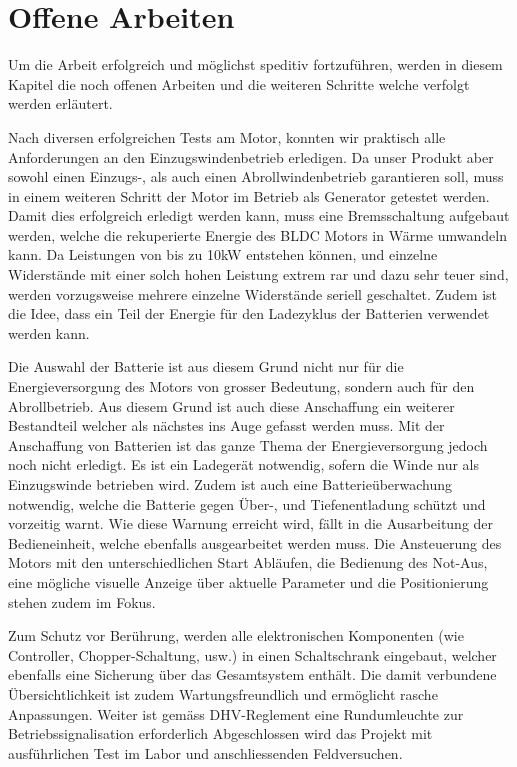 \section{Offene Arbeiten}
Um die Arbeit erfolgreich und möglichst speditiv fortzuführen, werden in diesem Kapitel die noch offenen Arbeiten und die weiteren Schritte welche verfolgt werden erläutert.

Nach diversen erfolgreichen Tests am Motor, konnten wir praktisch alle Anforderungen an den Einzugswindenbetrieb erledigen. Da unser Produkt aber sowohl einen Einzugs-, als auch einen Abrollwindenbetrieb garantieren soll, muss in einem weiteren Schritt der Motor im Betrieb als Generator getestet werden. Damit dies erfolgreich erledigt werden kann, muss eine Bremsschaltung aufgebaut werden, welche die rekuperierte Energie des BLDC Motors in Wärme umwandeln kann. Da Leistungen von bis zu 10kW entstehen können, und einzelne Widerstände mit einer solch hohen Leistung extrem rar und dazu sehr teuer sind, werden vorzugsweise mehrere einzelne Widerstände seriell geschaltet. Zudem ist die Idee, dass ein Teil der Energie für den Ladezyklus der Batterien verwendet werden kann.

Die Auswahl der Batterie ist aus diesem Grund nicht nur für die Energieversorgung des Motors von grosser Bedeutung, sondern auch für den Abrollbetrieb. Aus diesem Grund ist auch diese Anschaffung ein weiterer Bestandteil welcher als nächstes ins Auge gefasst werden muss. Mit der Anschaffung von Batterien ist das ganze Thema der Energieversorgung jedoch noch nicht erledigt. Es ist ein Ladegerät notwendig, sofern die Winde nur als Einzugswinde betrieben wird. Zudem ist auch eine Batterieüberwachung notwendig, welche die Batterie gegen Über-, und Tiefenentladung schützt und vorzeitig warnt. Wie diese Warnung erreicht wird, fällt in die Ausarbeitung der Bedieneinheit, welche ebenfalls ausgearbeitet werden muss. Die Ansteuerung des Motors mit den unterschiedlichen Start Abläufen, die Bedienung des Not-Aus, eine mögliche visuelle Anzeige über aktuelle Parameter und die Positionierung stehen zudem im Fokus.

Zum Schutz vor Berührung, werden alle elektronischen Komponenten (wie Controller, Chopper-Schaltung, usw.) in einen Schaltschrank eingebaut, welcher ebenfalls eine Sicherung über das Gesamtsystem enthält. Die damit verbundene Übersichtlichkeit ist zudem Wartungsfreundlich und ermöglicht rasche Anpassungen. Weiter ist gemäss DHV-Reglement eine Rundumleuchte zur Betriebssignalisation erforderlich 
Abgeschlossen wird das Projekt mit ausführlichen Test im Labor und anschliessenden Feldversuchen.